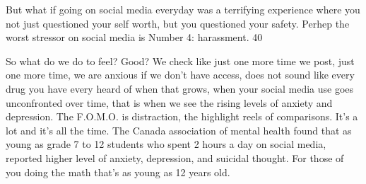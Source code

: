\documentclass[UTF8,12pt,a4paper]{article}
\theoremstyle{Problem}
\theoremstyle{Solution}
\begin{document}
\begin{appendix}
    But what if going on social media everyday was a terrifying experience where you not just questioned your self worth, but you questioned your safety. Perhep the worst stressor on social media is Number 4: harassment. 40%
    
    So what do we do to feel? Good? We check like just one more time we post, just one more time, we are anxious if we don't have access, does not sound like every drug you have every heard of when that grows, when your social media use goes unconfronted over time, that is when we see the rising levels of anxiety and depression. The F.O.M.O. is distraction, the highlight reels of comparisons. It's a lot and it's all the time. The Canada association of mental health found that as young as grade 7 to 12 students who spent 2 hours a day on social media, reported higher level of anxiety, depression, and suicidal thought. For those of you doing the math that's as young as 12 years old. 
    

\end{appendix}
\end{document}
